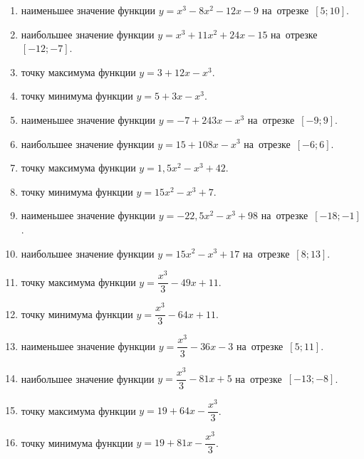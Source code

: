 \documentclass[a4paper,10pt]{article}
\begin{document}
\begin{enumerate}
\item {} наименьшее значение функции $y=x^3 -8x^2-12x-9$ на~отрезке~$\left[5;10\right]$.

\item {} наибольшее значение функции $y=x^3 +11x^2+24x-15$ на~отрезке~$\left[-12;-7\right]$.

\item {} точку максимума функции $y=3+12x-x^3$.

\item {} точку минимума функции $y=5+3x-x^3$.

\item {} наименьшее значение функции $y=-7+243x-x^3$ на~отрезке~$\left[-9;9\right]$.

\item {} наибольшее значение функции $y=15+108x-x^3$ на~отрезке~$\left[-6;6\right]$.

\item {} точку максимума функции $y=1,5x^2-x^3+42$.

\item {} точку минимума функции $y=15x^2-x^3+7$.

\item {} наименьшее значение функции $y=-22,5x^2-x^3+98$ на~отрезке~$\left[-18;-1\right]$.

\item {} наибольшее значение функции $y=15x^2-x^3+17$ на~отрезке~$\left[8;13\right]$.

\item {} точку максимума функции $y=\dfrac{x^3}{3} -49x+11$.

\item {} точку минимума функции $y=\dfrac{x^3}{3} -64x+11$.

\item {} наименьшее значение функции $y=\dfrac{x^3}{3} -36x-3$ на~отрезке~$\left[5;11\right]$.

\item {} наибольшее значение функции $y=\dfrac{x^3}{3} -81x+5$ на~отрезке~$\left[-13;-8\right]$.

\item {} точку максимума функции $y=19 +64x-\dfrac{x^3}{3}$.

\item {} точку минимума функции $y=19 +81x-\dfrac{x^3}{3}$.


\end{enumerate}
\end{document}
